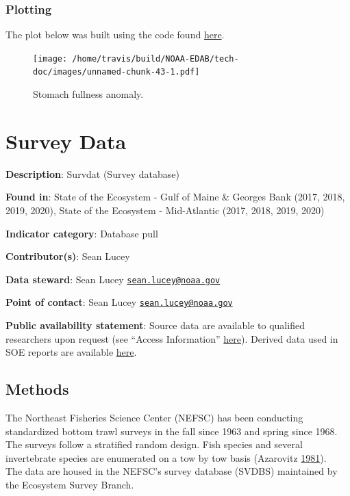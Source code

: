 \documentclass[
]{book}
\begin{document}
\hypertarget{plotting-33}{%
\subsection{Plotting}\label{plotting-33}}

The plot below was built using the code found
\href{https://github.com/NOAA-EDAB/ecodata/blob/master/chunk-scripts/macrofauna.Rmd-ma-stomachs.R}{here}.

\begin{figure}
\centering
\texttt{[image: /home/travis/build/NOAA-EDAB/tech-doc/images/unnamed-chunk-43-1.pdf]}
\caption{\label{fig:unnamed-chunk-43}Stomach fullness anomaly.}
\end{figure}

\hypertarget{survdat}{%
\chapter{Survey Data}\label{survdat}}

\textbf{Description}: Survdat (Survey database)

\textbf{Found in}: State of the Ecosystem - Gulf of Maine \& Georges Bank (2017, 2018, 2019, 2020), State of the Ecosystem - Mid-Atlantic (2017, 2018, 2019, 2020)

\textbf{Indicator category}: Database pull

\textbf{Contributor(s)}: Sean Lucey

\textbf{Data steward}: Sean Lucey \href{mailto:sean.lucey@noaa.gov}{\nolinkurl{sean.lucey@noaa.gov}}

\textbf{Point of contact}: Sean Lucey \href{mailto:sean.lucey@noaa.gov}{\nolinkurl{sean.lucey@noaa.gov}}

\textbf{Public availability statement}: Source data are available to qualified researchers upon request (see ``Access Information'' \href{https://inport.nmfs.noaa.gov/inport/item/22560}{here}). Derived data used in SOE reports are available \href{https://comet.nefsc.noaa.gov/erddap/tabledap/group_landings_soe_v1.html}{here}.

\hypertarget{methods-40}{%
\section{Methods}\label{methods-40}}

The Northeast Fisheries Science Center (NEFSC) has been conducting standardized bottom trawl surveys
in the fall since 1963 and spring since 1968. The surveys follow a stratified random design. Fish
species and several invertebrate species are enumerated on a tow by tow basis (Azarovitz \protect\hyperlink{ref-Azarovitz1981}{1981}).\\
The data are housed in the NEFSC's survey database (SVDBS) maintained by the Ecosystem Survey Branch.
\end{document}
